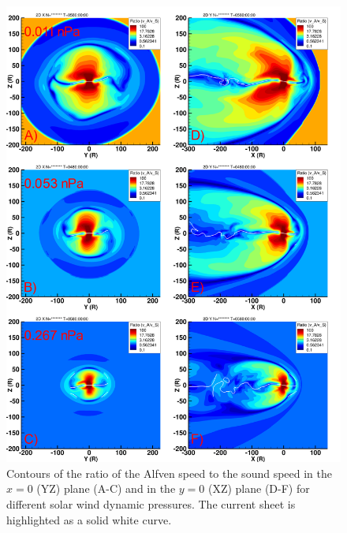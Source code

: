 \begin{figure}
    \centering
    \includegraphics[height=0.9\textheight]{images6/compare_runs_currentsheet_RatioAlfvenSonic.png}
    \caption{Contours of the ratio of the Alfven speed to the sound speed in the $x=0$ (YZ) plane (A-C) and in the $y=0$ (XZ) plane (D-F) for different solar wind dynamic pressures. The current sheet is highlighted as a solid white curve.}
    \label{fig:chp6-comparison-slices-ratioalfvensound}
\end{figure}

